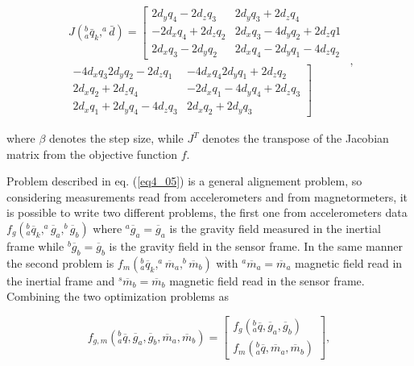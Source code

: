 \begin{equation}
\label{eq4_13}
\begin{split}
J(^b_a \bar{q}_k, ^a \bar{d}) = 
\left [ \begin{array}{cc} 
2d_yq_4 - 2d_zq_3 & 2d_yq_3+ 2d_zq_4\\ 
-2d_xq_4 + 2d_zq_2 & 2d_xq_3 - 4d_yq_2 + 2d_zq1 \\ 
2d_xq_3 - 2d_yq_2 & 2d_xq_4 - 2d_yq_1 - 4d_zq_2 \end{array} \right. \\
\left. \begin{array}{rr}
-4d_x q_3 2d_y q_2 - 2d_z q_1 & -4d_x q_4 2d_y q_1 + 2d_z q_2\\
2d_x q_2 + 2d_z q_4 &  -2d_x q_1 - 4d_y q_4 + 2d_z q_3\\
2d_x q_1 + 2 d_y q_4 - 4 d_z q_3 & 2 d_x q_2 + 2d_y q_3  
\end{array} \right ] \end{split}, 
\end{equation}

\noindent where $\beta$ denotes the step size, while $J^T$ denotes the transpose of the Jacobian matrix from the objective function $f$. 

Problem described in eq. (\ref{eq4_05}) is a general alignement problem, so considering measurements read from accelerometers and from magnetormeters, it is possible to write two different problems, the first one from accelerometers data $f_g(^b_a \overline{q}_k, ^a \overline{g}_a, ^b \overline{g}_b)$ where $^a\overline{g}_a = \overline{g}_a$ is the gravity field measured in the inertial frame while $^b \overline{g}_b = \overline{g}_b$ is the gravity field in the sensor frame. In the same manner the second problem is $f_m(^b_a \overline{q}_k, ^a \overline{m}_a, ^b \overline{m}_b)$ with $^a\overline{m}_a = \overline{m}_a$ magnetic field read in the inertial frame and $^s \overline{m}_b = \overline{m}_b$ magnetic field read in the sensor frame.
Combining the two optimization problems as

\begin{equation}
\label{eq4_14}
f_{g,m}(^b_a \overline{q},\overline{g}_a,\overline{g}_b,\overline{m}_a,\overline{m}_b) = \left [ \begin{array}{c} f_g(^b_a \overline{q}, \overline{g}_a, \overline{g}_b) \\  f_m(^b_a \overline{q},  \overline{m}_a,  \overline{m}_b) \end{array} \right ],
\end{equation}

